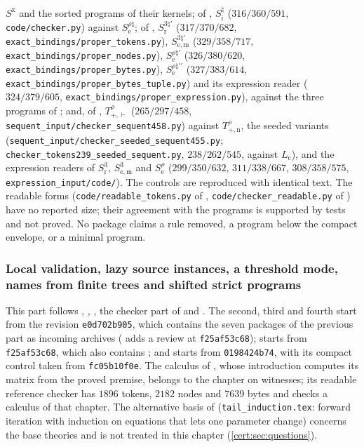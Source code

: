 $S^{\mathrm x}$ and the sorted programs of their kernels; of ,
$S^{\natural}_{\mathrm i}$ ($316/360/591$, \texttt{code/checker.py}) against
$S^{\rho\natural}_{\mathrm e}$; of ,
$S^{3\natural\prime}_{\mathrm r}$ ($317/370/682$, \texttt{exact\_bindings/proper\_tokens.py}),
$S^{3\natural\prime}_{\mathrm{e,m}}$ ($329/358/717$, \texttt{exact\_bindings/proper\_nodes.py}),
$S^{\rho\natural\prime}_{\mathrm e}$ ($326/380/620$, \texttt{exact\_bindings/proper\_bytes.py}),
$S^{\rho\natural\prime\prime}_{\mathrm e}$ ($327/383/614$,
\texttt{exact\_bindings/proper\_bytes\_tuple.py}) and its expression reader ($324/379/605$,
\texttt{exact\_bindings/proper\_expression.py}), against the three programs of
; and, of , $T^{\rho}_{+,\vdash}$
($265/297/458$, \texttt{sequent\_input/checker\_sequent458.py}) against
$T^{\rho}_{+,\mathrm n}$, the seeded variants
(\texttt{sequent\_input/checker\_seeded\_sequent455.py};
\texttt{checker\_tokens239\_seeded\_sequent.py}, $238/262/545$, against $L_{\mathrm c}$), and
the expression readers of $S^{3}_{\mathrm r}$, $S^{3}_{\mathrm{e,m}}$ and
$S^{\rho}_{\mathrm e}$ ($299/350/632$, $311/338/667$, $308/358/575$,
\texttt{expression\_input/code/}). The controls are reproduced with identical text. The
readable forms (\texttt{code/readable\_tokens.py} of ,
\texttt{code/checker\_readable.py} of ) have no reported size;
their agreement with the programs is supported by tests and not proved. No package claims
a rule removed, a program below the compact envelope, or a minimal program.

\subsubsection*{Local validation, lazy source instances, a threshold mode, names from finite trees and shifted strict programs}

This part follows , ,
, the checker part of  and
. The second, third and fourth start from the revision
\texttt{e0d702b905}, which contains the seven packages of the previous part as incoming
archives ( adds a review at \texttt{f25af53c68});
 starts from \texttt{f25af53c68}, which also contains
; and  starts from
\texttt{0198424b74}, with its compact control taken from \texttt{fc05b10f0e}. The calculus
of , whose introduction computes its matrix from the
proved premise, belongs to the chapter on witnesses; its readable reference checker has
$1896$ tokens, $2182$ nodes and $7639$ bytes and checks a calculus of that chapter. The
alternative basis of  (\texttt{tail\_induction.tex}: forward
iteration with induction on equations that lets one parameter change) concerns the base
theories and is not treated in this chapter (\cref{cert:sec:questions}).

